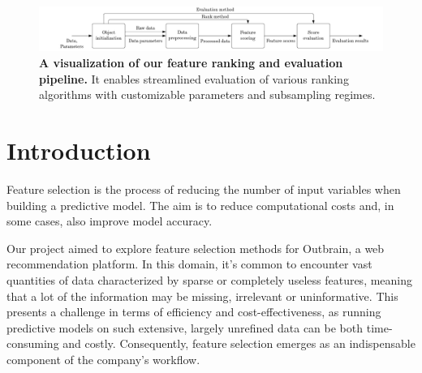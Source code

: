 \documentclass[fleqn,moreauthors,10pt]{ds_report}
\affiliation{\textit{Advisors: Jure Demšar, Blaž Mramor, Blaž Škrlj}}
\begin{document}
\flushbottom 

\maketitle
\thispagestyle{empty}



\begin{figure}[!ht]
	\includegraphics[width=\linewidth]{img/block_diagram_cropped.png}
    \captionsetup{justification=centering}
	\caption{\textbf{A visualization of our feature ranking and evaluation pipeline.} It enables streamlined evaluation of various ranking algorithms with customizable parameters and subsampling regimes.}
	\label{fig:block_diagram}
\end{figure}


\section*{Introduction}

Feature selection is the process of reducing the number of input variables when building a predictive model. The aim is to reduce computational costs and, in some cases, also improve model accuracy.

Our project aimed to explore feature selection methods for Outbrain, a web recommendation platform. 
%
In this domain, it's common to encounter vast quantities of data characterized by sparse or completely useless features, meaning that a lot of the information may be missing, irrelevant or uninformative. This presents a challenge in terms of efficiency and cost-effectiveness, as running predictive models on such extensive, largely unrefined data can be both time-consuming and costly. Consequently, feature selection emerges as an indispensable component of the company's workflow.
%

\end{document}
